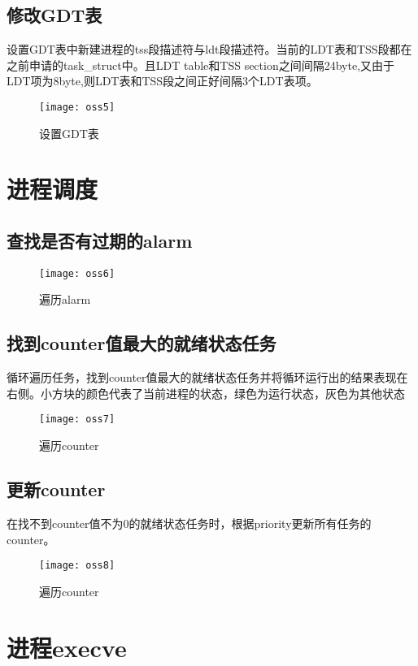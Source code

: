 \documentclass[]{report}
\begin{document}
\subsection{修改GDT表}
设置GDT表中新建进程的tss段描述符与ldt段描述符。当前的LDT表和TSS段都在之前申请的task\_struct中。且LDT table和TSS section之间间隔24byte,又由于LDT项为8byte,则LDT表和TSS段之间正好间隔3个LDT表项。
\begin{figure}[H]%
	\centering  %
	\texttt{[image: oss5]}  
	\caption{设置GDT表}  %
	\label{fig23}
\end{figure}
\section{进程调度}
\subsection{查找是否有过期的alarm}
\begin{figure}[H]%
	\centering  %
	\texttt{[image: oss6]}  
	\caption{遍历alarm}  %
	\label{fig24}
\end{figure}
\subsection{找到counter值最大的就绪状态任务}
循环遍历任务，找到counter值最大的就绪状态任务并将循环运行出的结果表现在右侧。小方块的颜色代表了当前进程的状态，绿色为运行状态，灰色为其他状态
\begin{figure}[H]%
	\centering  %
	\texttt{[image: oss7]}  
	\caption{遍历counter}  %
	\label{fig25}
\end{figure}
\subsection{更新counter}
在找不到counter值不为0的就绪状态任务时，根据priority更新所有任务的counter。
\begin{figure}[H]%
	\centering  %
	\texttt{[image: oss8]}  
	\caption{遍历counter}  %
	\label{fig26}
\end{figure}

\section{进程execve}
\end{document}
